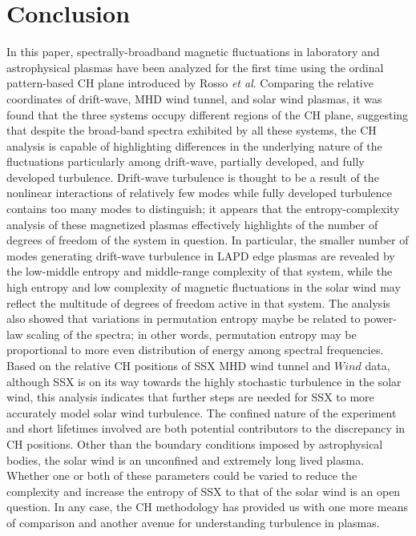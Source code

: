 \documentclass[aps,pre,twocolumn,secnumarabic,nobalancelastpage,amsmath,amssymb,
nofootinbib]{revtex4-1}
\begin{document}
\section{Conclusion}
In this paper, spectrally-broadband magnetic fluctuations in laboratory and astrophysical plasmas have been analyzed for the first time using the ordinal pattern-based CH plane introduced by Rosso \textit{et al}. Comparing the relative coordinates of drift-wave, MHD wind tunnel, and solar wind plasmas, it was found that the three systems occupy different regions of the CH plane, suggesting that despite the broad-band spectra exhibited by all these systems, the CH analysis is capable of highlighting differences in the underlying nature of the fluctuations particularly among drift-wave, partially developed, and fully developed turbulence. Drift-wave turbulence is thought to be a result of the nonlinear interactions of relatively few modes while fully developed turbulence contains too many modes to distinguish; it appears that the entropy-complexity analysis of these magnetized plasmas effectively highlights of the number of degrees of freedom of the system in question. In particular, the smaller number of modes generating drift-wave turbulence in LAPD edge plasmas are revealed by the low-middle entropy and middle-range complexity of that system, while the high entropy and low complexity of magnetic fluctuations in the solar wind may reflect the multitude of degrees of freedom active in that system. The analysis also showed that variations in permutation entropy maybe be related to power-law scaling of the spectra; in other words, permutation entropy may be proportional to more even distribution of energy among spectral frequencies. Based on the relative CH positions of SSX MHD wind tunnel and $\textit{Wind}$ data, although SSX is on its way towards the highly stochastic turbulence in the solar wind, this analysis indicates that further steps are needed for SSX  to more accurately model solar wind turbulence. The confined nature of the experiment and short lifetimes involved are both potential contributors to the discrepancy in CH positions. Other than the boundary conditions imposed by astrophysical bodies, the solar wind is an unconfined and extremely long lived plasma. Whether one or both of these parameters could be varied to reduce the complexity and increase the entropy of SSX to that of the solar wind is an open question. In any case, the CH methodology has provided us with one more means of comparison and another avenue for understanding turbulence in plasmas.
\end{document}
